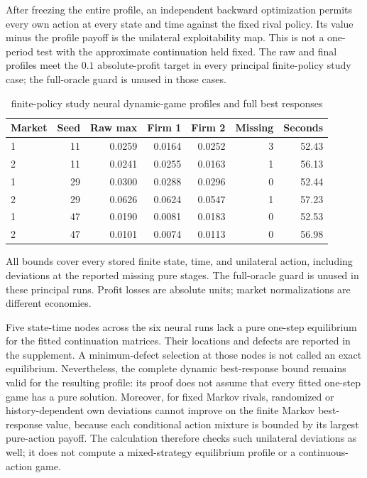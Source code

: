 After freezing the entire profile, an independent backward optimization permits every own action at every state and time against the fixed rival policy. Its value minus the profile payoff is the unilateral exploitability map. This is not a one-period test with the approximate continuation held fixed. The raw and final profiles meet the $0.1$ absolute-profit target in every principal finite-policy study case; the full-oracle guard is unused in those cases.

\begin{table}[htbp]\centering
\caption{finite-policy study neural dynamic-game profiles and full best responses}
\begin{small}\begin{tabular}{lrrrrrr}
\toprule
Market & Seed & Raw max & Firm 1 & Firm 2 & Missing & Seconds \\
\midrule
1 & 11 & 0.0259 & 0.0164 & 0.0252 & 3 & 52.43 \\
2 & 11 & 0.0241 & 0.0255 & 0.0163 & 1 & 56.13 \\
1 & 29 & 0.0300 & 0.0288 & 0.0296 & 0 & 52.44 \\
2 & 29 & 0.0626 & 0.0624 & 0.0547 & 1 & 57.23 \\
1 & 47 & 0.0190 & 0.0081 & 0.0183 & 0 & 52.53 \\
2 & 47 & 0.0101 & 0.0074 & 0.0113 & 0 & 56.98 \\
\bottomrule\end{tabular}\end{small}
\par\smallskip\begin{minipage}{0.96\linewidth}\footnotesize All bounds cover every stored finite state, time, and unilateral action, including deviations at the reported missing pure stages. The full-oracle guard is unused in these principal runs. Profit losses are absolute units; market normalizations are different economies.\end{minipage}
\end{table}


Five state-time nodes across the six neural runs lack a pure one-step equilibrium for the fitted continuation matrices. Their locations and defects are reported in the supplement. A minimum-defect selection at those nodes is not called an exact equilibrium. Nevertheless, the complete dynamic best-response bound remains valid for the resulting profile: its proof does not assume that every fitted one-step game has a pure solution. Moreover, for fixed Markov rivals, randomized or history-dependent own deviations cannot improve on the finite Markov best-response value, because each conditional action mixture is bounded by its largest pure-action payoff. The calculation therefore checks such unilateral deviations as well; it does not compute a mixed-strategy equilibrium profile or a continuous-action game.


